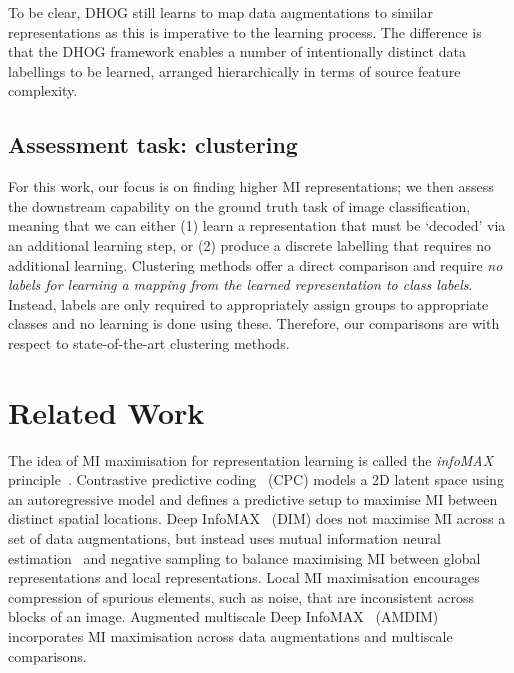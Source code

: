 \documentclass[runningheads]{llncs}
\begin{document}
To be clear, DHOG still learns to map data augmentations to similar representations as this is imperative to the learning process. The difference is that the DHOG framework enables a number of intentionally distinct data labellings to be learned, arranged hierarchically in terms of source feature complexity. 

\subsection{Assessment task: clustering}
For this work, our focus is on finding higher MI representations; we then assess the downstream capability on the ground truth task of image classification, meaning that we can either (1) learn a representation that must be `decoded' via an additional learning step, or (2) produce a discrete labelling that requires no additional learning. Clustering methods offer a direct comparison and require \emph{no labels for learning a mapping from the learned representation to class labels}. Instead, labels are only required to appropriately assign groups to appropriate classes and no learning is done using these. Therefore, our comparisons are with respect to state-of-the-art clustering methods. 


\section{Related Work}\label{sec:related}
The idea of MI maximisation for representation learning is called the \textit{infoMAX} principle~\cite{linsker1988self, tschannen2019mutual}. Contrastive predictive coding~\cite{oord2018representation} (CPC) models a 2D latent space using an autoregressive model and defines a predictive setup to maximise MI between distinct spatial locations. Deep InfoMAX~\cite{hjelm2018learning} (DIM) does not maximise MI across a set of data augmentations, but instead uses mutual information neural estimation~\cite{belghazi2018mine} and negative sampling to balance maximising MI between global representations and local representations. Local MI maximisation encourages compression of spurious elements, such as noise, that are inconsistent across blocks of an image. Augmented multiscale Deep InfoMAX~\cite{bachman2019learning} (AMDIM) incorporates MI maximisation across data augmentations and multiscale comparisons. 
\end{document}
